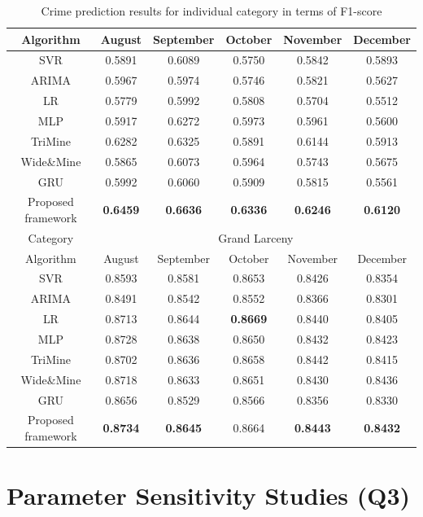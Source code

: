 \begin{table}
\begin{tabular}{c|c|c|c|c|c}
        \hline
        Algorithm & August & September & October & November & December \\[0.1cm]
        \hline
        SVR & 0.5891 & 0.6089 & 0.5750 & 0.5842 & 0.5893\\[0.1cm]
        ARIMA & 0.5967 & 0.5974 & 0.5746 & 0.5821 & 0.5627\\[0.1cm]
        LR & 0.5779 & 0.5992 & 0.5808 & 0.5704 & 0.5512\\[0.1cm]
        MLP & 0.5917 & 0.6272 & 0.5973 & 0.5961 & 0.5600\\[0.1cm]
        TriMine & 0.6282 & 0.6325 & 0.5891 & 0.6144 & 0.5913\\[0.1cm]
        Wide\&Mine & 0.5865 & 0.6073 & 0.5964 & 0.5743 & 0.5675\\[0.1cm]
        GRU & 0.5992 & 0.6060 & 0.5909 & 0.5815 & 0.5561\\[0.1cm]
        \toprule
        Proposed framework & \bf 0.6459 & \bf 0.6636 & \bf 0.6336 & \bf 0.6246 & \bf 0.6120\\
        \bottomrule
        \toprule
        Category &\multicolumn{5}{|c}{Grand Larceny}\\[0.1cm]
        \hline
        Algorithm & August & September & October & November & December \\[0.1cm]
        \hline
        SVR & 0.8593 & 0.8581 & 0.8653 & 0.8426 & 0.8354\\[0.1cm]
        ARIMA & 0.8491 & 0.8542 & 0.8552 & 0.8366 & 0.8301\\[0.1cm]
        LR & 0.8713 & 0.8644 & \bf 0.8669 & 0.8440 & 0.8405\\[0.1cm]
        MLP & 0.8728 & 0.8638 & 0.8650 & 0.8432 & 0.8423\\[0.1cm]
        TriMine & 0.8702 & 0.8636 & 0.8658 & 0.8442 & 0.8415\\[0.1cm]
        Wide\&Mine & 0.8718 & 0.8633 & 0.8651 & 0.8430 & 0.8436\\[0.1cm]
        GRU & 0.8656 & 0.8529 & 0.8566 & 0.8356 & 0.8330\\[0.1cm]
        \toprule
        Proposed framework & \bf 0.8734 & \bf 0.8645 & 0.8664 & \bf 0.8443 & \bf 0.8432\\
        \bottomrule
    \end{tabular}
    \caption{Crime prediction results for individual category in terms of F1-score}
    \label{table:category}
\end{table}

\section{Parameter Sensitivity Studies (Q3)}

